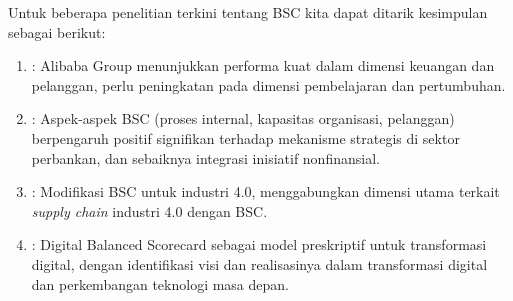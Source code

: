 \documentclass{article}
\begin{document}
Untuk beberapa penelitian terkini tentang BSC kita dapat ditarik kesimpulan sebagai berikut:
\begin{enumerate}
    \item \cite{Qiu2020}: Alibaba Group menunjukkan performa kuat dalam dimensi keuangan dan pelanggan, perlu peningkatan pada dimensi pembelajaran dan pertumbuhan.
    \item \cite{Ali2021TheBS}: Aspek-aspek BSC (proses internal, kapasitas organisasi, pelanggan) berpengaruh positif signifikan terhadap mekanisme strategis di sektor perbankan, dan sebaiknya integrasi inisiatif nonfinansial.
    \item \cite{Frederico2020PerformanceMF}: Modifikasi BSC untuk industri 4.0, menggabungkan dimensi utama terkait \emph{supply chain} industri 4.0 dengan BSC.
    \item \cite{Fabac2022}: Digital Balanced Scorecard sebagai model preskriptif untuk transformasi digital, dengan identifikasi visi dan realisasinya dalam transformasi digital dan perkembangan teknologi masa depan.
\end{enumerate}




\end{document}
